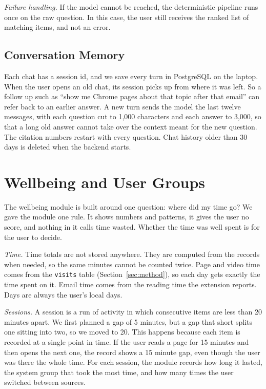\documentclass[conference]{IEEEtran}
\begin{document}
\textit{Failure handling.} If the model cannot be reached, the deterministic pipeline runs once on the raw question. In this case, the user still receives the ranked list of matching items, and not an error.

\subsection{Conversation Memory}
Each chat has a session id, and we save every turn in PostgreSQL on the laptop. When the user opens an old chat, its session picks up from where it was left. So a follow up such as ``show me Chrome pages about that topic after that email'' can refer back to an earlier answer. A new turn sends the model the last twelve messages, with each question cut to 1,000 characters and each answer to 3,000, so that a long old answer cannot take over the context meant for the new question. The citation numbers restart with every question. Chat history older than 30 days is deleted when the backend starts.

\section{Wellbeing and User Groups}\label{sec:wba}
The wellbeing module is built around one question: where did my time go? We gave the module one rule. It shows numbers and patterns, it gives the user no score, and nothing in it calls time wasted. Whether the time was well spent is for the user to decide.

\textit{Time.} Time totals are not stored anywhere. They are computed from the records when needed, so the same minutes cannot be counted twice. Page and video time comes from the \texttt{visits} table (Section~\ref{sec:method}), so each day gets exactly the time spent on it. Email time comes from the reading time the extension reports. Days are always the user's local days.

\textit{Sessions.} A session is a run of activity in which consecutive items are less than 20 minutes apart. We first planned a gap of 5 minutes, but a gap that short splits one sitting into two, so we moved to 20. This happens because each item is recorded at a single point in time. If the user reads a page for 15 minutes and then opens the next one, the record shows a 15 minute gap, even though the user was there the whole time. For each session, the module records how long it lasted, the system group that took the most time, and how many times the user switched between sources.
\end{document}
